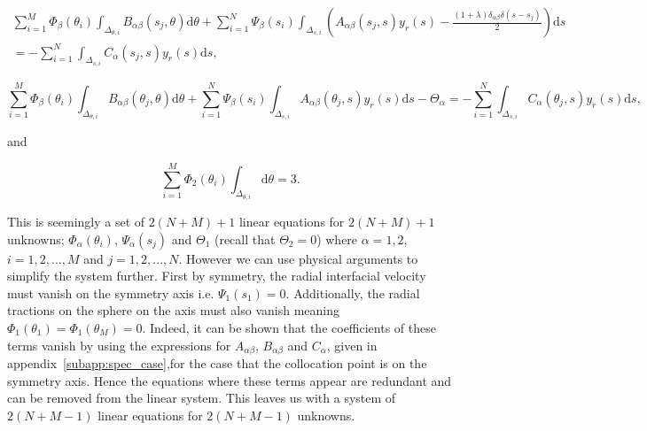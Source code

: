 \documentclass[12pt]{article}
\begin{document}
\begin{align}
\label{equ:dis_ie_1}
\sum_{i = 1}^{M} \Phi_{\beta}(\theta_{i}) \int_{\Delta_{\theta,i}} B_{\alpha\beta}(s_{j},\theta) \mathrm{d}\theta + \sum_{i=1}^{N} \Psi_{\beta}(s_{i}) \int_{\Delta_{s,i}} \left(A_{\alpha\beta}(s_{j},s) y_{r}(s) - \frac{(1 + \lambda) \delta_{\alpha\beta} \delta(s - s_{j})}{2}\right) \mathrm{d}s \nonumber \\
= - \sum_{i = 1}^{N} \int_{\Delta_{s,i}} C_{\alpha}(s_{j},s) y_{r}(s) \mathrm{d}s,
\end{align}

\begin{equation}
\label{equ:dis_ie_2}
\sum_{i = 1}^{M} \Phi_{\beta}(\theta_{i}) \int_{\Delta_{\theta,i}} B_{\alpha\beta}(\theta_{j},\theta) \mathrm{d}\theta + \sum_{i=1}^{N} \Psi_{\beta}(s_{i}) \int_{\Delta_{s,i}} A_{\alpha\beta}(\theta_{j},s) y_{r}(s) \mathrm{d}s - \Theta_{\alpha} = - \sum_{i = 1}^{N} \int_{\Delta_{s,i}} C_{\alpha}(\theta_{j},s) y_{r}(s) \mathrm{d}s,
\end{equation}

and 

\begin{equation}
\label{equ:dis_ie_3}
\sum_{i = 1}^{M} \Phi_{2}(\theta_{i}) \int_{\Delta_{\theta,i}} \mathrm{d}\theta = 3.
\end{equation}

This is seemingly a set of $2(N + M) + 1$ linear equations for $2(N + M) + 1$ unknowns; $\Phi_{\alpha}(\theta_{i})$, $\Psi_{\alpha}(s_{j})$ and $\Theta_{1}$ (recall that $\Theta_{2} = 0$) where $\alpha = 1,2$, $i = 1,2,...,M$ and $j = 1,2,...,N$. However we can use physical arguments to simplify the system further. First by symmetry, the radial interfacial velocity must vanish on the symmetry axis i.e. $\Psi_{1}(s_{1}) = 0$. Additionally, the radial tractions on the sphere on the axis must also vanish meaning $\Phi_{1}(\theta_{1}) = \Phi_{1}(\theta_{M}) = 0$. Indeed, it can be shown that the coefficients of these terms vanish by using the expressions for $A_{\alpha\beta}$, $B_{\alpha\beta}$ and $C_{\alpha}$, given in appendix~\ref{subapp:spec_case},for the case that the collocation point is on the symmetry axis. Hence the equations where these terms appear are redundant and can be removed from the linear system. This leaves us with a system of $2(N + M - 1)$ linear equations for $2(N + M - 1)$ unknowns.
\end{document}
